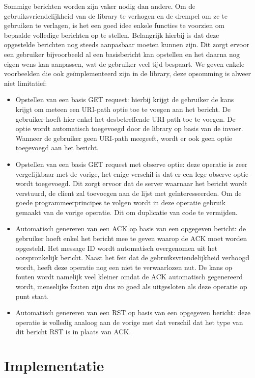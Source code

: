 Sommige berichten worden zijn vaker nodig dan andere. Om de gebruiksvriendelijkheid van de library te verhogen en de drempel om ze te gebruiken te verlagen, is het een goed idee enkele functies te voorzien om bepaalde volledige berichten op te stellen. Belangrijk hierbij is dat deze opgestelde berichten nog steeds aanpasbaar moeten kunnen zijn. Dit zorgt ervoor een gebruiker bijvoorbeeld al een basisbericht kan opstellen en het daarna nog eigen wens kan aanpassen, wat de gebruiker veel tijd bespaart. We geven enkele voorbeelden die ook ge\"{i}mplementeerd zijn in de library, deze opsomming is alweer niet limitatief:
\begin{itemize}
\item Opstellen van een basis GET request: hierbij krijgt de gebruiker de kans krijgt om meteen een URI-path optie toe te voegen aan het bericht. De gebruiker hoeft hier enkel het desbetreffende URI-path toe te voegen. De optie wordt automatisch toegevoegd door de library op basis van de invoer. Wanneer de gebruiker geen URI-path meegeeft, wordt er ook geen optie toegevoegd aan het bericht.
\item Opstellen van een basis GET request met observe optie: deze operatie is zeer vergelijkbaar met de vorige, het enige verschil is dat er een lege observe optie wordt toegevoegd. Dit zorgt ervoor dat de server waarnaar het bericht wordt verstuurd, de client zal toevoegen aan de lijst met ge\"{i}nteresseerden. Om de goede programmeerprincipes te volgen wordt in deze operatie gebruik gemaakt van de vorige operatie. Dit om duplicatie van code te vermijden.
\item Automatisch genereren van een ACK op basis van een opgegeven bericht: de gebruiker hoeft enkel het bericht mee te geven waarop de ACK moet worden opgesteld. Het message ID wordt automatisch overgenomen uit het oorspronkelijk bericht. Naast het feit dat de gebruiksvriendelijkheid verhoogd wordt, heeft deze operatie nog een niet te verwaarlozen nut. De kans op fouten wordt namelijk veel kleiner omdat de ACK automatisch gegenereerd wordt, menselijke fouten zijn dus zo goed als uitgesloten als deze operatie op punt staat.
\item Automatisch genereren van een RST op basis van een opgegeven bericht: deze operatie is volledig analoog aan de vorige met dat verschil dat het type van dit bericht RST is in plaats van ACK.
\end{itemize}

\section{Implementatie}


